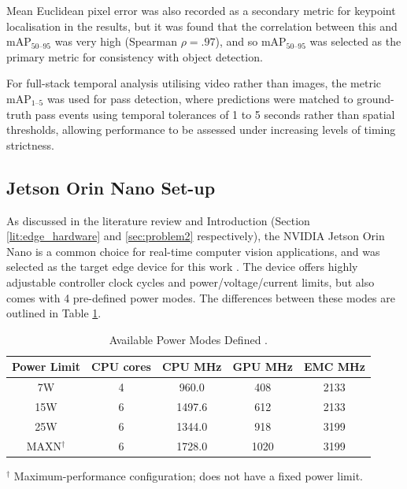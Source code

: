 Mean Euclidean pixel error was also recorded as a secondary metric for keypoint localisation in the results, but it was found that the correlation between this and $\mathrm{mAP}_{50\text{--}95}$ was very high (Spearman $\rho=.97$), and so $\mathrm{mAP}_{50\text{--}95}$ was selected as the primary metric for consistency with object detection.

For full-stack temporal analysis utilising video rather than images, the metric $\mathrm{mAP}_{1\text{--}5}$ was used for pass detection, where predictions were matched to ground-truth pass events using temporal tolerances of 1 to 5 seconds rather than spatial thresholds, allowing performance to be assessed under increasing levels of timing strictness.

\subsection{Jetson Orin Nano Set-up}

As discussed in the literature review and Introduction (Section \ref{lit:edge_hardware} and \ref{sec:problem2} respectively), the NVIDIA Jetson Orin Nano is a common choice for real-time computer vision applications, and was selected as the target edge device for this work \cite{JetsonOrinNano}. The device offers highly adjustable controller clock cycles and power/voltage/current limits, but also comes with 4 pre-defined power modes. The differences between these modes are outlined in Table \ref{tab:orin_power_modes_full}. 

\begin{table}[H]
\centering
\caption{Available Power Modes Defined \cite{JetsonOrinNano}.}
\label{tab:orin_power_modes_full}
\begin{tabular}{ccccc}
\toprule
\textbf{Power Limit} & \textbf{CPU cores} & \textbf{CPU MHz} & \textbf{GPU MHz} & \textbf{EMC MHz} \\
\midrule
7W    & 4 & 960.0  & 408  & 2133 \\
15W   & 6 & 1497.6 & 612  & 2133 \\
25W   & 6 & 1344.0 & 918  & 3199 \\
\rowcolor{yellow!20}
MAXN$^\dagger$ & 6 & 1728.0 & 1020 & 3199 \\
\bottomrule
\end{tabular}

\vspace{0.3em}
\raggedright
\footnotesize $^\dagger$ Maximum-performance configuration; does not have a fixed power limit.
\end{table}


